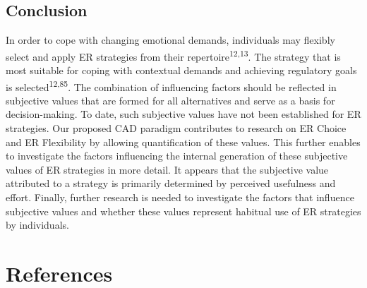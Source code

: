 \documentclass[
  man,floatsintext]{apa6}
\begin{document}
\hypertarget{conclusion}{%
\subsection{Conclusion}\label{conclusion}}

In order to cope with changing emotional demands, individuals may flexibly select and apply ER strategies from their repertoire\textsuperscript{12,13}.
The strategy that is most suitable for coping with contextual demands and achieving regulatory goals is selected\textsuperscript{12,85}.
The combination of influencing factors should be reflected in subjective values that are formed for all alternatives and serve as a basis for decision-making.
To date, such subjective values have not been established for ER strategies.
Our proposed CAD paradigm contributes to research on ER Choice and ER Flexibility by allowing quantification of these values.
This further enables to investigate the factors influencing the internal generation of these subjective values of ER strategies in more detail.
It appears that the subjective value attributed to a strategy is primarily determined by perceived usefulness and effort.
Finally, further research is needed to investigate the factors that influence subjective values and whether these values represent habitual use of ER strategies by individuals.

\hypertarget{references}{%
\section{References}\label{references}}

\begingroup
\setlength{\parindent}{-0.5in}
\setlength{\leftskip}{0.5in}
\end{document}
